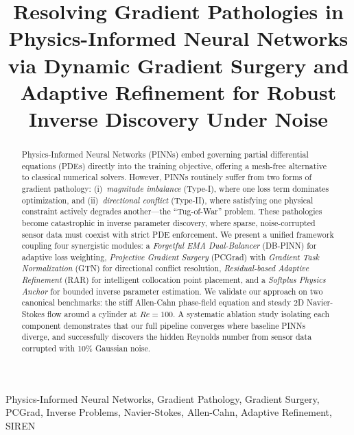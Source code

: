 \documentclass[conference]{IEEEtran}
\begin{document}
\title{Resolving Gradient Pathologies in Physics-Informed Neural Networks via Dynamic Gradient Surgery and Adaptive Refinement for Robust Inverse Discovery Under Noise}

\author{
}

\maketitle

\begin{abstract}
Physics-Informed Neural Networks (PINNs) embed governing partial differential equations (PDEs) directly into the training objective, offering a mesh-free alternative to classical numerical solvers. However, PINNs routinely suffer from two forms of gradient pathology: (i)~\emph{magnitude imbalance} (Type-I), where one loss term dominates optimization, and (ii)~\emph{directional conflict} (Type-II), where satisfying one physical constraint actively degrades another---the ``Tug-of-War'' problem. These pathologies become catastrophic in inverse parameter discovery, where sparse, noise-corrupted sensor data must coexist with strict PDE enforcement. We present a unified framework coupling four synergistic modules: a \emph{Forgetful EMA Dual-Balancer} (DB-PINN) for adaptive loss weighting, \emph{Projective Gradient Surgery} (PCGrad) with \emph{Gradient Task Normalization} (GTN) for directional conflict resolution, \emph{Residual-based Adaptive Refinement} (RAR) for intelligent collocation point placement, and a \emph{Softplus Physics Anchor} for bounded inverse parameter estimation. We validate our approach on two canonical benchmarks: the stiff Allen-Cahn phase-field equation and steady 2D Navier-Stokes flow around a cylinder at $Re=100$. A systematic ablation study isolating each component demonstrates that our full pipeline converges where baseline PINNs diverge, and successfully discovers the hidden Reynolds number from sensor data corrupted with 10\% Gaussian noise.
\end{abstract}

\begin{IEEEkeywords}
Physics-Informed Neural Networks, Gradient Pathology, Gradient Surgery, PCGrad, Inverse Problems, Navier-Stokes, Allen-Cahn, Adaptive Refinement, SIREN
\end{IEEEkeywords}
\end{document}
